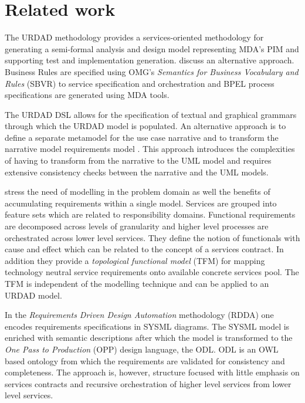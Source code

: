 \section{Related work \label{sec:relatedWork}}

The URDAD methodology provides a services-oriented methodology for generating a semi-formal analysis and design model representing MDA's PIM and supporting test and implementation generation. \cite{iacob_model-driven_2008} discuss an alternative approach. Business Rules are specified using OMG's {\em Semantics for Business Vocabulary and Rules} (SBVR) to service specification and orchestration and BPEL process specifications are generated using MDA tools. 

The URDAD DSL allows for the specification of textual and graphical grammars through which the URDAD model is populated. An alternative approach is to define a separate metamodel for the use case narrative and to transform the narrative model requirements model \cite{hoffmann_towards_2009,osis_transforming_2010}. This approach introduces the complexities of having to transform from the narrative to the UML model and requires extensive consistency checks between the narrative and the UML models.

\cite{asnina_computation_2010} stress the need of modelling in the problem domain as well the benefits of accumulating requirements within a single model. Services are grouped into feature sets which are related to responsibility domains. Functional requirements are decomposed across levels of granularity and higher level processes are orchestrated across lower level services. They define the notion of functionals with cause and effect which can be related to the concept of a services contract. In addition they provide a {\em topological functional model} (TFM) for mapping technology neutral service requirements onto available concrete services pool. The TFM is independent of the modelling technique and can be applied to an URDAD model.

In the {\em Requirements Driven Design Automation} methodology (RDDA) \cite{cardei_model_2008} one encodes requirements specifications in SYSML diagrams. The SYSML model is enriched with semantic descriptions after which the model is transformed to the {\em One Pass to Production} (OPP) design language, the ODL. ODL is an OWL based ontology from which the requirements are validated for consistency and completeness. The approach is, however, structure focused with little emphasis on services contracts and recursive orchestration of higher level services from lower level services.

